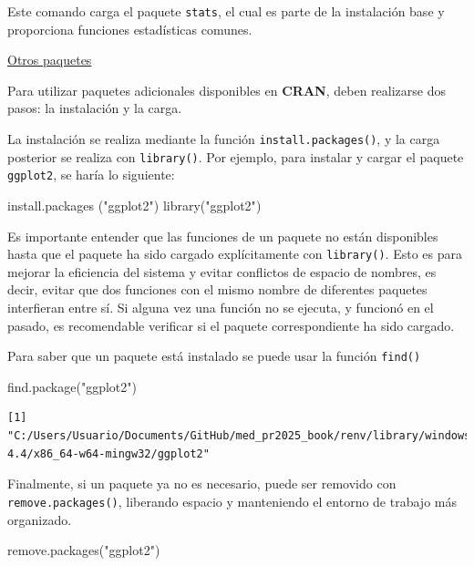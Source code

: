 \documentclass[
  letterpaper,
  DIV=11,
  numbers=noendperiod]{scrartcl}
\newenvironment{Shaded}{\begin{snugshade}}{\end{snugshade}}
\newcommand{\FunctionTok}[1]{\textcolor[rgb]{0.28,0.35,0.67}{#1}}
\newcommand{\NormalTok}[1]{\textcolor[rgb]{0.00,0.23,0.31}{#1}}
\newcommand{\StringTok}[1]{\textcolor[rgb]{0.13,0.47,0.30}{#1}}
\begin{document}
Este comando carga el paquete \texttt{stats}, el cual es parte de la
instalación base y proporciona funciones estadísticas comunes.

\uline{Otros paquetes}

Para utilizar paquetes adicionales disponibles en \textbf{CRAN}, deben
realizarse dos pasos: la instalación y la carga.

La instalación se realiza mediante la función
\texttt{install.packages()}, y la carga posterior se realiza con
\texttt{library()}. Por ejemplo, para instalar y cargar el paquete
\texttt{ggplot2}, se haría lo siguiente:

\begin{Shaded}
\begin{Highlighting}[]
\FunctionTok{install.packages}\NormalTok{ (}\StringTok{"ggplot2"}\NormalTok{)   }
\FunctionTok{library}\NormalTok{(}\StringTok{"ggplot2"}\NormalTok{)           }
\end{Highlighting}
\end{Shaded}

Es importante entender que las funciones de un paquete no están
disponibles hasta que el paquete ha sido cargado explícitamente con
\texttt{library()}. Esto es para mejorar la eficiencia del sistema y
evitar conflictos de espacio de nombres, es decir, evitar que dos
funciones con el mismo nombre de diferentes paquetes interfieran entre
sí. Si alguna vez una función no se ejecuta, y funcionó en el pasado, es
recomendable verificar si el paquete correspondiente ha sido cargado.

Para saber que un paquete está instalado se puede usar la función
\texttt{find()}

\begin{Shaded}
\begin{Highlighting}[]
\FunctionTok{find.package}\NormalTok{(}\StringTok{"ggplot2"}\NormalTok{)}
\end{Highlighting}
\end{Shaded}

\begin{verbatim}
[1] "C:/Users/Usuario/Documents/GitHub/med_pr2025_book/renv/library/windows/R-4.4/x86_64-w64-mingw32/ggplot2"
\end{verbatim}

Finalmente, si un paquete ya no es necesario, puede ser removido con
\texttt{remove.packages()}, liberando espacio y manteniendo el entorno
de trabajo más organizado.

\begin{Shaded}
\begin{Highlighting}[]
\FunctionTok{remove.packages}\NormalTok{(}\StringTok{"ggplot2"}\NormalTok{)}
\end{Highlighting}
\end{Shaded}
\end{document}
